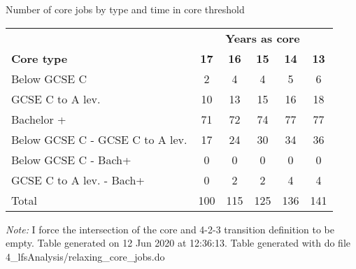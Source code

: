 \begin{center}
\begin{threeparttable}[!h]
\caption{Number of core jobs by type and time in core threshold}
\begin{tabular}{lccccc}
\toprule
\toprule
& \multicolumn{5}{c}{\textbf{Years as core}} \\
\cline{2-6}
\textbf{Core type}&\multicolumn{1}{c}{\textbf{17}}&\multicolumn{1}{c}{\textbf{16}}&\multicolumn{1}{c}{\textbf{15}}&\multicolumn{1}{c}{\textbf{14}}&\multicolumn{1}{c}{\textbf{13}} \\
\midrule
\midrule
Below GCSE C&2&4&4&5&6 \\
GCSE C to A lev.&10&13&15&16&18 \\
Bachelor +&71&72&74&77&77 \\
Below GCSE C - GCSE C to A lev.&17&24&30&34&36 \\
Below GCSE C - Bach+&0&0&0&0&0 \\
GCSE C to A lev. - Bach+&0&2&2&4&4 \\
Total&100&115&125&136&141 \\
\bottomrule
\bottomrule
\end{tabular}
\begin{tablenotes}
\item \footnotesize \textit{Note:} I force the intersection of the core and 4-2-3 transition definition to be empty. Table generated on 12 Jun 2020 at 12:36:13. Table generated with do file 4\_lfsAnalysis/relaxing\_core\_jobs.do
\end{tablenotes}
\end{threeparttable}
\end{center}
